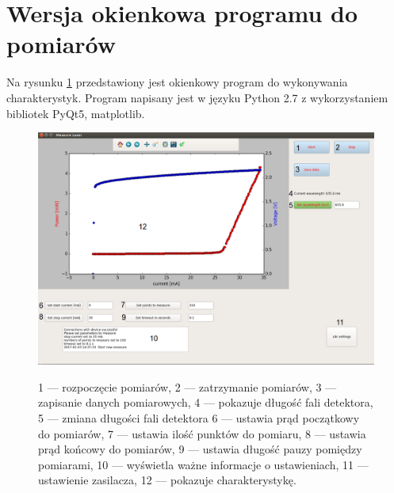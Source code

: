 \section{Wersja okienkowa programu do pomiarów}
Na rysunku \ref{gui_rys} przedstawiony jest okienkowy program do wykonywania charakterystyk. Program napisany jest w języku
Python 2.7 z wykorzystaniem bibliotek PyQt5, matplotlib.
\begin{figure}[h]
\center
  \includegraphics[scale=0.35]{gui.eps}
  \label{gui_rys}
  \caption{1 --- rozpoczęcie pomiarów, 2 --- zatrzymanie pomiarów, 3 --- zapisanie danych pomiarowych, 4 --- pokazuje długość fali detektora,
5 --- zmiana długości fali detektora 6 --- ustawia prąd początkowy do pomiarów, 7 --- ustawia ilość punktów do pomiaru,
8 --- ustawia prąd końcowy do pomiarów, 9 --- ustawia długość pauzy pomiędzy pomiarami, 10 --- wyświetla ważne informacje o ustawieniach,
11 --- ustawienie zasilacza, 12 --- pokazuje charakterystykę.}
\end{figure}
\newpage
